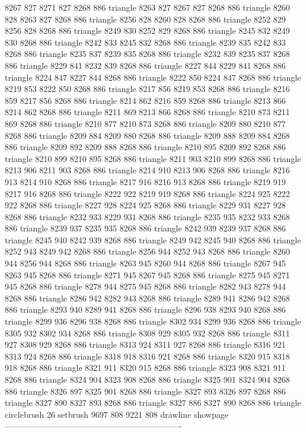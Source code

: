 8267 827 8271 827 8268 886 triangle
8263 827 8267 827 8268 886 triangle
8260 828 8263 827 8268 886 triangle
8256 828 8260 828 8268 886 triangle
8252 829 8256 828 8268 886 triangle
8249 830 8252 829 8268 886 triangle
8245 832 8249 830 8268 886 triangle
8242 833 8245 832 8268 886 triangle
8239 835 8242 833 8268 886 triangle
8235 837 8239 835 8268 886 triangle
8232 839 8235 837 8268 886 triangle
8229 841 8232 839 8268 886 triangle
8227 844 8229 841 8268 886 triangle
8224 847 8227 844 8268 886 triangle
8222 850 8224 847 8268 886 triangle
8219 853 8222 850 8268 886 triangle
8217 856 8219 853 8268 886 triangle
8216 859 8217 856 8268 886 triangle
8214 862 8216 859 8268 886 triangle
8213 866 8214 862 8268 886 triangle
8211 869 8213 866 8268 886 triangle
8210 873 8211 869 8268 886 triangle
8210 877 8210 873 8268 886 triangle
8209 880 8210 877 8268 886 triangle
8209 884 8209 880 8268 886 triangle
8209 888 8209 884 8268 886 triangle
8209 892 8209 888 8268 886 triangle
8210 895 8209 892 8268 886 triangle
8210 899 8210 895 8268 886 triangle
8211 903 8210 899 8268 886 triangle
8213 906 8211 903 8268 886 triangle
8214 910 8213 906 8268 886 triangle
8216 913 8214 910 8268 886 triangle
8217 916 8216 913 8268 886 triangle
8219 919 8217 916 8268 886 triangle
8222 922 8219 919 8268 886 triangle
8224 925 8222 922 8268 886 triangle
8227 928 8224 925 8268 886 triangle
8229 931 8227 928 8268 886 triangle
8232 933 8229 931 8268 886 triangle
8235 935 8232 933 8268 886 triangle
8239 937 8235 935 8268 886 triangle
8242 939 8239 937 8268 886 triangle
8245 940 8242 939 8268 886 triangle
8249 942 8245 940 8268 886 triangle
8252 943 8249 942 8268 886 triangle
8256 944 8252 943 8268 886 triangle
8260 944 8256 944 8268 886 triangle
8263 945 8260 944 8268 886 triangle
8267 945 8263 945 8268 886 triangle
8271 945 8267 945 8268 886 triangle
8275 945 8271 945 8268 886 triangle
8278 944 8275 945 8268 886 triangle
8282 943 8278 944 8268 886 triangle
8286 942 8282 943 8268 886 triangle
8289 941 8286 942 8268 886 triangle
8293 940 8289 941 8268 886 triangle
8296 938 8293 940 8268 886 triangle
8299 936 8296 938 8268 886 triangle
8302 934 8299 936 8268 886 triangle
8305 932 8302 934 8268 886 triangle
8308 929 8305 932 8268 886 triangle
8311 927 8308 929 8268 886 triangle
8313 924 8311 927 8268 886 triangle
8316 921 8313 924 8268 886 triangle
8318 918 8316 921 8268 886 triangle
8320 915 8318 918 8268 886 triangle
8321 911 8320 915 8268 886 triangle
8323 908 8321 911 8268 886 triangle
8324 904 8323 908 8268 886 triangle
8325 901 8324 904 8268 886 triangle
8326 897 8325 901 8268 886 triangle
8327 893 8326 897 8268 886 triangle
8327 890 8327 893 8268 886 triangle
8327 886 8327 890 8268 886 triangle
circlebrush 26 setbrush
9697 808 9221 808 drawline
showpage
----------------------------------------------------------------

